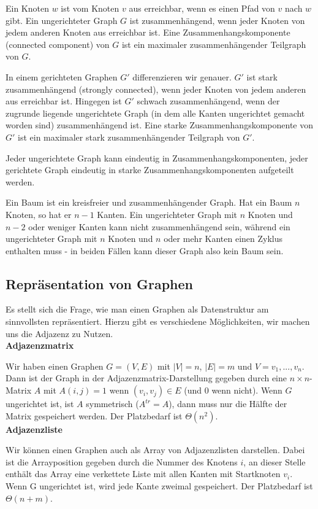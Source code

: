 \documentclass[12pt]{article}
\begin{document}
Ein Knoten $w$ ist vom Knoten $v$ aus erreichbar, wenn es einen Pfad von $v$ nach $w$ gibt. Ein ungerichteter Graph $G$ ist zusammenhängend, wenn jeder Knoten von jedem anderen Knoten aus erreichbar ist. Eine Zusammenhangskomponente (connected component) von $G$ ist ein maximaler zusammenhängender Teilgraph von $G$.

In einem gerichteten Graphen $G'$ differenzieren wir genauer. $G'$ ist stark zusammenhängend (strongly connected), wenn jeder Knoten von jedem anderen aus erreichbar ist. Hingegen ist $G'$ schwach zusammenhängend, wenn der zugrunde liegende ungerichtete Graph (in dem alle Kanten ungerichtet gemacht worden sind) zusammenhängend ist. Eine starke Zusammenhangskomponente von $G'$ ist ein maximaler stark zusammenhängender Teilgraph von $G'$.

Jeder ungerichtete Graph kann eindeutig in Zusammenhangskomponenten, jeder gerichtete Graph eindeutig in starke Zusammenhangskomponenten aufgeteilt werden.

Ein Baum ist ein kreisfreier und zusammenhängender Graph. Hat ein Baum $n$ Knoten, so hat er $n-1$ Kanten. Ein ungerichteter Graph mit $n$ Knoten und $n-2$ oder weniger Kanten kann nicht zusammenhängend sein, während ein ungerichteter Graph mit $n$ Knoten und $n$ oder mehr Kanten einen Zyklus enthalten muss - in beiden Fällen kann dieser Graph also kein Baum sein.

\subsection{Repräsentation von Graphen}

Es stellt sich die Frage, wie man einen Graphen als Datenstruktur am sinnvollsten repräsentiert. Hierzu gibt es verschiedene Möglichkeiten, wir machen uns die Adjazenz zu Nutzen.\\

\textbf{Adjazenzmatrix}

Wir haben einen Graphen $G = (V, E)$ mit $|V| = n$, $|E| = m$ und $V = {v_1, ..., v_n}$. Dann ist der Graph in der Adjazenzmatrix-Darstellung gegeben durch eine $n \times n$-Matrix $A$ mit $A(i, j) = 1$ wenn $(v_i, v_j) \in E$ (und $0$ wenn nicht). Wenn $G$ ungerichtet ist, ist $A$ symmetrisch ($A^{tr} = A$), dann muss nur die Hälfte der Matrix gespeichert werden. Der Platzbedarf ist $\Theta(n^2)$.\\

\textbf{Adjazenzliste}

Wir können einen Graphen auch als Array von Adjazenzlisten darstellen. Dabei ist die Arrayposition gegeben durch die Nummer des Knotens $i$, an dieser Stelle enthält das Array eine verkettete Liste mit allen Kanten mit Startknoten $v_i$. Wenn G ungerichtet ist, wird jede Kante zweimal gespeichert. Der Platzbedarf ist $\Theta(n+m)$.
\end{document}
